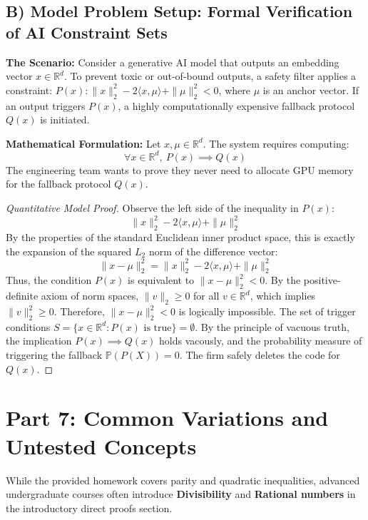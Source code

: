 \documentclass[11pt]{article}
\theoremstyle{remark}
\begin{document}
\subsection{B) Model Problem Setup: Formal Verification of AI Constraint Sets}
\textbf{The Scenario:} Consider a generative AI model that outputs an embedding vector $x \in \mathbb{R}^d$. To prevent toxic or out-of-bound outputs, a safety filter applies a constraint: $P(x): \|x\|_2^2 - 2 \langle x, \mu \rangle + \|\mu\|_2^2 < 0$, where $\mu$ is an anchor vector. If an output triggers $P(x)$, a highly computationally expensive fallback protocol $Q(x)$ is initiated. 

\textbf{Mathematical Formulation:} 
Let $x, \mu \in \mathbb{R}^d$. The system requires computing:
\[ \forall x \in \mathbb{R}^d, \ P(x) \implies Q(x) \]
The engineering team wants to prove they never need to allocate GPU memory for the fallback protocol $Q(x)$.
\begin{proof}[Quantitative Model Proof]
Observe the left side of the inequality in $P(x)$:
\[ \|x\|_2^2 - 2 \langle x, \mu \rangle + \|\mu\|_2^2 \]
By the properties of the standard Euclidean inner product space, this is exactly the expansion of the squared $L_2$ norm of the difference vector:
\[ \|x - \mu\|_2^2 = \|x\|_2^2 - 2 \langle x, \mu \rangle + \|\mu\|_2^2 \]
Thus, the condition $P(x)$ is equivalent to $\|x - \mu\|_2^2 < 0$. 
By the positive-definite axiom of norm spaces, $\|v\|_2 \ge 0$ for all $v \in \mathbb{R}^d$, which implies $\|v\|_2^2 \ge 0$.
Therefore, $\|x - \mu\|_2^2 < 0$ is logically impossible. 
The set of trigger conditions $S = \{x \in \mathbb{R}^d : P(x) \text{ is true}\} = \emptyset$.
By the principle of vacuous truth, the implication $P(x) \implies Q(x)$ holds vacously, and the probability measure of triggering the fallback $\mathbb{P}(P(X)) = 0$. The firm safely deletes the code for $Q(x)$.
\end{proof}

\newpage
\section{Part 7: Common Variations and Untested Concepts}

While the provided homework covers parity and quadratic inequalities, advanced undergraduate courses often introduce \textbf{Divisibility} and \textbf{Rational numbers} in the introductory direct proofs section.
\end{document}
